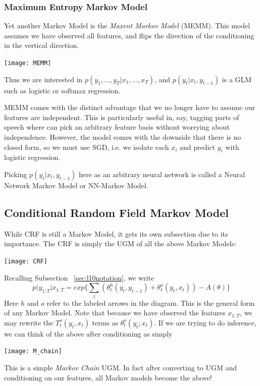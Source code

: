 \documentclass{article}
\begin{document}
\subsubsection{Maximum Entropy Markov Model}
Yet another Markov Model is the \textit{Maxent Markov Model} (MEMM). This model assumes we have observed all features, and flips the direction of the conditioning in the vertical direction.
\begin{center}
\texttt{[image: MEMM]} 
\end{center}
Thus we are interested in $p(y_1,\ldots,y_T | x_1, \ldots, x_T)$, and $p(y_t|x_t,y_{t-1})$ is a GLM such as logistic or softmax regression.

MEMM comes with the distinct advantage that we no longer have to assume our features are independent. This is particularly useful in, say, tagging parts of speech where can pick an arbitrary feature basis without worrying about independence. However, the model comes with the downside that there is no closed form, so we must use SGD, i.e. we isolate each $x_i$ and predict $y_i$ with logistic regression.

Picking $p(y_t|x_t,y_{t-1})$ here as an arbitrary neural network is called a Neural Network Markov Model or NN-Markov Model. 
\subsection{Conditional Random Field Markov Model}
While CRF is still a Markov Model, it gets its own subsection due to its importance. The CRF is simply the UGM of all the above Markov Models:
\begin{center}
\texttt{[image: CRF]} 
\end{center}
Recalling Subsection ~\ref{sec:l10notation}, we write
\[
p(y_{1:T}|x_{1:T} = exp\{\sum\limits_{t}(\theta_t^h(y_t,y_{t-1})+\theta_t^o(y_t,x_t)) - A(\theta) \}
\]
Here $h$ and $o$ refer to the labeled arrows in the diagram.
This is the general form of any Markov Model. Note that because we have observed the features $x_{1:T}$, we may rewrite the $T_t^o(y_t,x_t)$ terms as $\theta_t^o(y_t;x_t)$. If we are trying to do inference, we can think of the above after conditioning as simply
\begin{center}
\texttt{[image: M\_chain]} 
\end{center}
This is a simple \textit{Markov Chain} UGM. In fact after converting to UGM and conditioning on our features, all Markov models become the above! 
\end{document}
